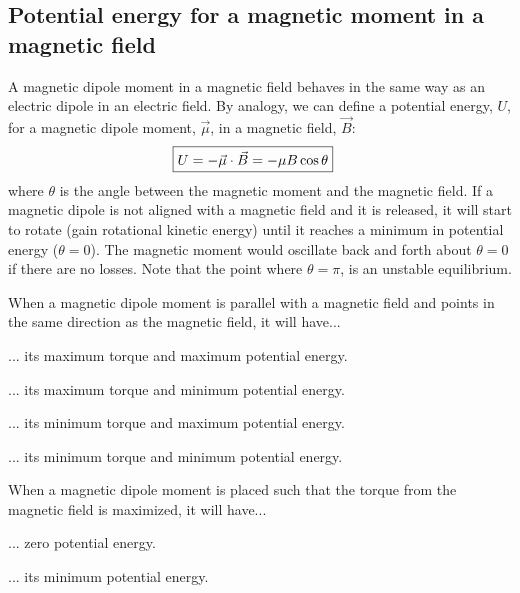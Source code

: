 \subsection{Potential energy for a magnetic moment in a magnetic field}
A magnetic dipole moment in a magnetic field behaves in the same way as an electric dipole in an electric field. By analogy, we can define a potential energy, $U$, for a magnetic dipole moment, $\vec \mu$, in a magnetic field, $\vec B$:
\begin{align*}
\Aboxed{U =-\vec \mu \cdot \vec B =- \mu B \cos\theta}
\end{align*}
where $\theta$ is the angle between the magnetic moment and the magnetic field. If a magnetic dipole is not aligned with a magnetic field and it is released, it will start to rotate (gain rotational kinetic energy) until it reaches a minimum in potential energy ($\theta = 0$). The magnetic moment would oscillate back and forth about $\theta =0$ if there are no losses. Note that the point where $\theta = \pi$, is an unstable equilibrium.
\begin{checkpoint}{}
	\begin{MCquestion}{When a magnetic dipole moment is parallel with a magnetic field and points in the same direction as the magnetic field, it will have...}
		\item ... its maximum torque and maximum potential energy.
		\item ... its maximum torque and minimum potential energy.
		\item ... its minimum torque and maximum potential energy.
		\item ... its minimum torque and minimum potential energy. \correct
	\end{MCquestion}
\end{checkpoint}

\begin{checkpoint}{}
	\begin{MCquestion}{When a magnetic dipole moment is placed such that the torque from the magnetic field is maximized, it will have...}
		\item ... zero potential energy. \correct
		\item ... its minimum potential energy.
	\end{MCquestion}
\end{checkpoint}

